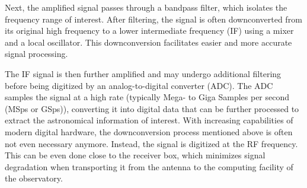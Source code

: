 Next, the amplified signal passes through a bandpass filter, which isolates the frequency range of interest. After filtering, the signal is often downconverted from its original high frequency to a lower intermediate frequency (IF) using a mixer and a local oscillator. This downconversion facilitates easier and more accurate signal processing.

The IF signal is then further amplified and may undergo additional filtering before being digitized by an analog-to-digital converter (ADC). The ADC samples the signal at a high rate (typically Mega- to Giga Samples per second (MSps or GSps)), converting it into digital data that can be further processed to extract the astronomical information of interest. With increasing capabilities of modern digital hardware, the downconversion process mentioned above is often not even necessary anymore. Instead, the signal is digitized at the RF frequency. This can be even done close to the receiver box, which minimizes signal degradation when transporting it from the antenna to the computing facility of the observatory.


